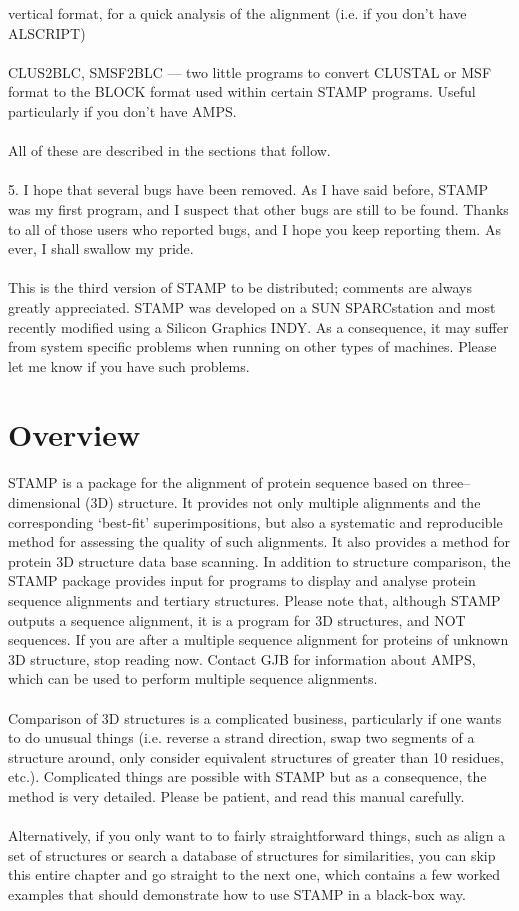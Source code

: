 vertical format, for a quick analysis of the alignment (i.e. if you
don't have ALSCRIPT)\\
\\
CLUS2BLC, SMSF2BLC --- two little programs to convert CLUSTAL or MSF
format to the BLOCK format used within certain STAMP programs.  Useful
particularly if you don't have AMPS.\\
\\
All of these are described in the sections that follow.\\
\\
5. I hope that several bugs have been removed.  As I have said
before, STAMP was my first program, and I suspect that other bugs
are still to be found.  Thanks to all of those users who reported
bugs, and I hope you keep reporting them.  As ever, I shall swallow
my pride.\\
\\
This is the third version of STAMP to be distributed; comments are
always greatly appreciated.  STAMP was developed on a SUN
SPARCstation and most recently modified using a Silicon Graphics
INDY.   As a consequence, it may suffer from system specific
problems when running on other types of machines.   Please let me know if
you have such problems.


\section{Overview}

STAMP is a package for the alignment of protein sequence based on
three--dimensional (3D) structure.  It provides not only multiple
alignments and the corresponding `best-fit' superimpositions, but
also a systematic and reproducible method for assessing the
quality of such alignments.  It also provides a method for protein
3D structure data base scanning.  In addition to structure
comparison, the STAMP package provides input for programs to
display and analyse protein sequence alignments and tertiary structures.
Please note that, although STAMP outputs a sequence alignment, it is 
a program for 3D structures, and NOT sequences.  If 
you are after a multiple sequence alignment for proteins of unknown 3D 
structure, stop reading now.  Contact GJB for information
about AMPS, which can be used to perform multiple sequence
alignments.\\
\\
Comparison of 3D structures is a complicated
business, particularly if one wants to do unusual things (i.e.
reverse a strand direction, swap two segments of a structure
around, only consider equivalent structures of greater
than 10 residues, etc.).  Complicated things are possible with STAMP but
as a consequence, the method is very detailed.  Please be patient, and 
read this manual carefully.\\
\\
Alternatively, if you only want to to fairly straightforward things, such
as align a set of structures or search a database of structures for
similarities, you can skip this entire chapter and go straight to the
next one, which contains a few worked examples that should demonstrate how
to use STAMP in a black-box way.

